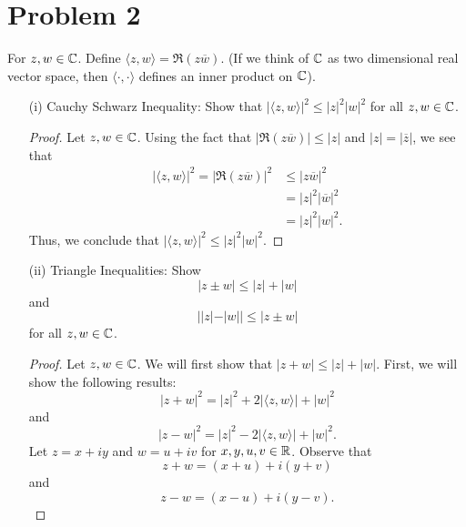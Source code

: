 \documentclass[a4paper]{article}
\begin{document}
    \section*{Problem 2}  For \( z,w \in \mathbb{C}  \). Define \( \langle z , w \rangle = \Re(z \overline{w}) \). (If we think of \(  \mathbb{C}  \) as two dimensional real vector space, then \( \langle \cdot  ,  \cdot  \rangle  \) defines an inner product on \( \mathbb{C}  \)). 
        \begin{enumerate}
            \item[(i)] Cauchy Schwarz Inequality: 
                Show that \( | \langle z , w \rangle |^{2} \leq | z |^{2} | w |^{2} \) for all \( z,w \in \mathbb{C}  \).
                \begin{proof}
                    Let \( z,w \in \mathbb{C}  \). Using the fact that \( | \Re(z \overline{w}) |  \leq | z  |  \) and \( | z  |  = | \overline{z} |  \), we see that  
                    \begin{align*}
                        | \langle z , w \rangle |^{2} = | \Re(z \overline{w}) |^{2} &\leq | z \overline{w} |^{2}  \\
                                                                                    &= | z  |^{2} | \overline{w}  |^{2} \\
                                                                                    &= | z  |^{2} | w |^{2}.
                    \end{align*}
                    Thus, we conclude that \( | \langle z , w \rangle |^{2} \leq | z |^{2} | w |^{2} \). 
                \end{proof}
            \item[(ii)] Triangle Inequalities: Show 
                \[  | z \pm w  | \leq | z  |  + | w  | \]
                and 
                \[  | | z  |  - | w |  | \leq | z \pm w  |  \]
                for all \( z,w \in \mathbb{C}  \).
                \begin{proof}
                Let \( z,w \in \mathbb{C}  \). We will first show that \(  | z + w  | \leq | z  |  + | w |  \). First, we will show the following results:
                \[  | z + w  |^{2} = | z |^{2} + 2 | \langle z , w \rangle | + | w |^{2} \tag{1} \]
                and 
                \[  | z - w  |^{2} = | z |^{2} - 2 | \langle z , w \rangle | + | w |^{2}. \tag{2}  \]
                Let \( z = x + iy \) and \( w = u + i v  \) for \( x,y,u,v \in \mathbb{R}  \). Observe that   
                \[  z + w = (x+u) + i(y +v) \]
                and 
                \[  z - w = (x-u) + i(y - v). \]

\end{proof}
\end{enumerate}
\end{document}
